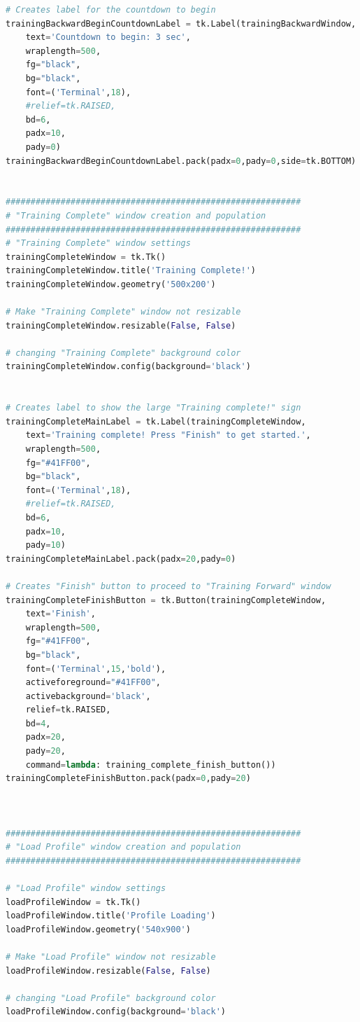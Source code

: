\documentclass[conference]{IEEEtran}
\begin{document}
\begin{lstlisting}[language=Python, caption=GUI CODE, label=gui_code]
# Creates label for the countdown to begin
trainingBackwardBeginCountdownLabel = tk.Label(trainingBackwardWindow, 
    text='Countdown to begin: 3 sec',
    wraplength=500, 
    fg="black", 
    bg="black", 
    font=('Terminal',18),
    #relief=tk.RAISED,
    bd=6,
    padx=10,
    pady=0)
trainingBackwardBeginCountdownLabel.pack(padx=0,pady=0,side=tk.BOTTOM)


###########################################################
# "Training Complete" window creation and population
###########################################################   
# "Training Complete" window settings
trainingCompleteWindow = tk.Tk()
trainingCompleteWindow.title('Training Complete!')
trainingCompleteWindow.geometry('500x200')

# Make "Training Complete" window not resizable
trainingCompleteWindow.resizable(False, False)

# changing "Training Complete" background color
trainingCompleteWindow.config(background='black')


# Creates label to show the large "Training complete!" sign
trainingCompleteMainLabel = tk.Label(trainingCompleteWindow, 
    text='Training complete! Press "Finish" to get started.',
    wraplength=500, 
    fg="#41FF00", 
    bg="black", 
    font=('Terminal',18),
    #relief=tk.RAISED,
    bd=6,
    padx=10,
    pady=10)
trainingCompleteMainLabel.pack(padx=20,pady=0)

# Creates "Finish" button to proceed to "Training Forward" window
trainingCompleteFinishButton = tk.Button(trainingCompleteWindow, 
    text='Finish', 
    wraplength=500,
    fg="#41FF00", 
    bg="black", 
    font=('Terminal',15,'bold'),
    activeforeground="#41FF00",
    activebackground='black',
    relief=tk.RAISED,
    bd=4,
    padx=20,
    pady=20,
    command=lambda: training_complete_finish_button())
trainingCompleteFinishButton.pack(padx=0,pady=20)



###########################################################
# "Load Profile" window creation and population
###########################################################

# "Load Profile" window settings
loadProfileWindow = tk.Tk()
loadProfileWindow.title('Profile Loading')
loadProfileWindow.geometry('540x900')

# Make "Load Profile" window not resizable
loadProfileWindow.resizable(False, False)

# changing "Load Profile" background color
loadProfileWindow.config(background='black')


\end{lstlisting}
\end{document}
